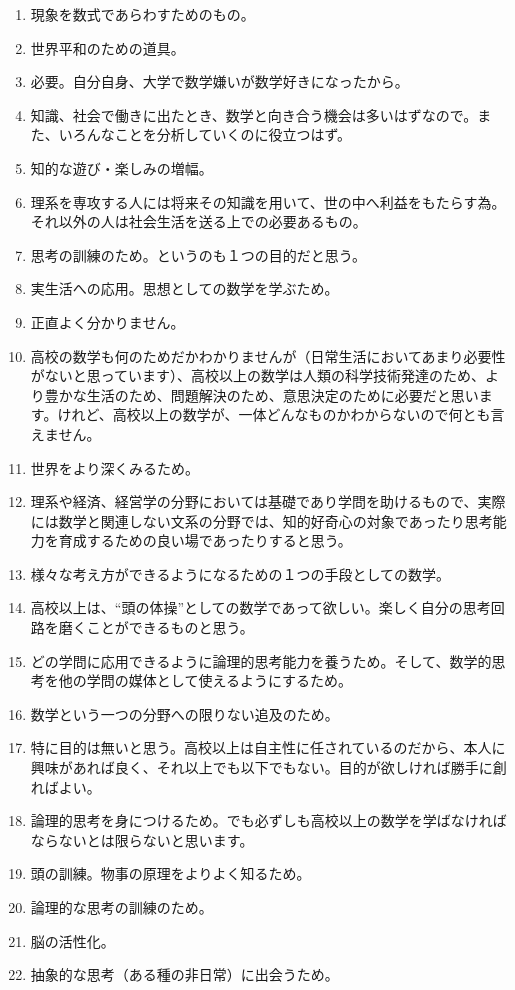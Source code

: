 \documentclass[twocolumn]{jarticle}
\begin{document}
\begin{enumerate}
\item 現象を数式であらわすためのもの。
\item 世界平和のための道具。
\item 必要。自分自身、大学で数学嫌いが数学好きになったから。
\item 知識、社会で働きに出たとき、数学と向き合う機会は多いはずなので。また、いろんなことを分析していくのに役立つはず。
\item 知的な遊び・楽しみの増幅。
\item 理系を専攻する人には将来その知識を用いて、世の中へ利益をもたらす為。それ以外の人は社会生活を送る上での必要あるもの。
\item 思考の訓練のため。というのも１つの目的だと思う。
\item 実生活への応用。思想としての数学を学ぶため。
\item 正直よく分かりません。
\item 高校の数学も何のためだかわかりませんが（日常生活においてあまり必要性がないと思っています）、高校以上の数学は人類の科学技術発達のため、より豊かな生活のため、問題解決のため、意思決定のために必要だと思います。けれど、高校以上の数学が、一体どんなものかわからないので何とも言えません。
\item 世界をより深くみるため。
\item 理系や経済、経営学の分野においては基礎であり学問を助けるもので、実際には数学と関連しない文系の分野では、知的好奇心の対象であったり思考能力を育成するための良い場であったりすると思う。
\item 様々な考え方ができるようになるための１つの手段としての数学。
\item 高校以上は、“頭の体操”としての数学であって欲しい。楽しく自分の思考回路を磨くことができるものと思う。
\item どの学問に応用できるように論理的思考能力を養うため。そして、数学的思考を他の学問の媒体として使えるようにするため。
\item 数学という一つの分野への限りない追及のため。
\item 特に目的は無いと思う。高校以上は自主性に任されているのだから、本人に興味があれば良く、それ以上でも以下でもない。目的が欲しければ勝手に創ればよい。
\item 論理的思考を身につけるため。でも必ずしも高校以上の数学を学ばなければならないとは限らないと思います。
\item 頭の訓練。物事の原理をよりよく知るため。
\item 論理的な思考の訓練のため。
\item 脳の活性化。
\item 抽象的な思考（ある種の非日常）に出会うため。

\end{enumerate}
\end{document}
